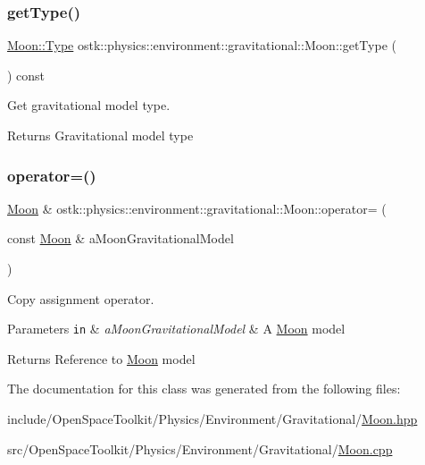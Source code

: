 \subsubsection{\texorpdfstring{get\+Type()}{getType()}}
{\footnotesize\ttfamily \hyperlink{classostk_1_1physics_1_1environment_1_1gravitational_1_1_moon_a09ec881799f85fdef3547ef443d57c27}{Moon\+::\+Type} ostk\+::physics\+::environment\+::gravitational\+::\+Moon\+::get\+Type (\begin{DoxyParamCaption}{ }\end{DoxyParamCaption}) const}



Get gravitational model type. 

\begin{DoxyReturn}{Returns}
Gravitational model type 
\end{DoxyReturn}
\mbox{\label{classostk_1_1physics_1_1environment_1_1gravitational_1_1_moon_a26226ccd5a99dd7826cc38ff3d023afc}} 
\subsubsection{\texorpdfstring{operator=()}{operator=()}}
{\footnotesize\ttfamily \hyperlink{classostk_1_1physics_1_1environment_1_1gravitational_1_1_moon}{Moon} \& ostk\+::physics\+::environment\+::gravitational\+::\+Moon\+::operator= (\begin{DoxyParamCaption}\item[{const \hyperlink{classostk_1_1physics_1_1environment_1_1gravitational_1_1_moon}{Moon} \&}]{a\+Moon\+Gravitational\+Model }\end{DoxyParamCaption})}



Copy assignment operator. 


\begin{DoxyParams}[1]{Parameters}
\mbox{\tt in}  & {\em a\+Moon\+Gravitational\+Model} & A \hyperlink{classostk_1_1physics_1_1environment_1_1gravitational_1_1_moon}{Moon} model \\
\hline
\end{DoxyParams}
\begin{DoxyReturn}{Returns}
Reference to \hyperlink{classostk_1_1physics_1_1environment_1_1gravitational_1_1_moon}{Moon} model 
\end{DoxyReturn}


The documentation for this class was generated from the following files\+:\begin{DoxyCompactItemize}
\item 
include/\+Open\+Space\+Toolkit/\+Physics/\+Environment/\+Gravitational/\hyperlink{_gravitational_2_moon_8hpp}{Moon.\+hpp}\item 
src/\+Open\+Space\+Toolkit/\+Physics/\+Environment/\+Gravitational/\hyperlink{_gravitational_2_moon_8cpp}{Moon.\+cpp}\end{DoxyCompactItemize}
